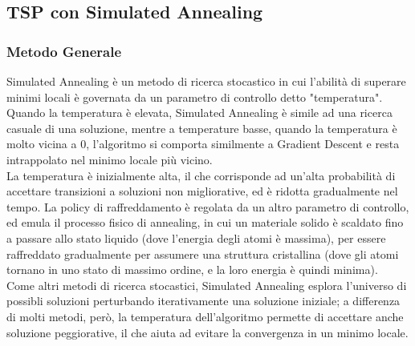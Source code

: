 \subsection{TSP con Simulated Annealing}

\subsubsection{Metodo Generale}


\noindent Simulated Annealing è un metodo di ricerca stocastico in cui l'abilità di superare minimi locali è governata da un parametro di controllo detto "temperatura". Quando la temperatura è elevata, Simulated Annealing è simile ad una ricerca casuale di una soluzione, mentre a temperature basse, quando la temperatura è molto vicina a 0, l'algoritmo si comporta similmente a Gradient Descent e resta intrappolato nel minimo locale più vicino. \\

\noindent La temperatura è inizialmente alta, il che corrisponde ad un'alta probabilità di accettare transizioni a soluzioni non migliorative, ed è ridotta gradualmente nel tempo. La policy di raffreddamento è regolata da un altro parametro di controllo, ed emula il processo fisico di annealing, in cui un materiale solido è scaldato fino a passare allo stato liquido (dove l'energia degli atomi è massima), per essere raffreddato gradualmente per assumere una struttura cristallina (dove gli atomi tornano in uno stato di massimo ordine, e la loro energia è quindi minima). \\

\noindent Come altri metodi di ricerca stocastici, Simulated Annealing esplora l'universo di possibli soluzioni perturbando iterativamente una soluzione iniziale; a differenza di molti metodi, però, la temperatura dell'algoritmo permette di accettare anche soluzione peggiorative, il che aiuta ad evitare la convergenza in un minimo locale. \\

